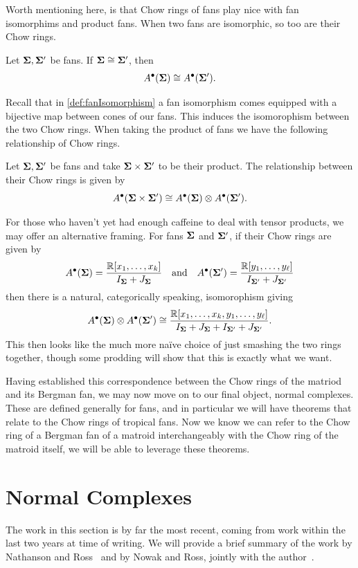 \documentclass[12pt,oneside]{../../sfsuthesis}
\begin{document}
Worth mentioning here, is that Chow rings of fans play nice with fan isomorphims and product fans.
When two fans are isomorphic, so too are their Chow rings.
\begin{proposition}
    Let \( {\bm{\Sigma}}, {\bm{\Sigma}}' \) be fans. If  \( {\bm{\Sigma}} \cong {\bm{\Sigma}}' \), then
    \[
        A^\bullet({\bm{\Sigma}}) \cong A^\bullet({\bm{\Sigma}}').
    \]
\end{proposition}
Recall that in \th\ref{def:fanIsomorphism} a fan isomorphism comes equipped with a bijective map between cones of our fans.
This induces the isomorophism between the two Chow rings.
When taking the product of fans we have the following relationship of Chow rings.
\begin{proposition}
    Let \( {\bm{\Sigma}}, {\bm{\Sigma}}' \) be fans and take \( {\bm{\Sigma}} \times {\bm{\Sigma}}' \) to be their product.
    The relationship between their Chow rings is given by
    \[
        A^\bullet({\bm{\Sigma}} \times {\bm{\Sigma}}') \cong A^\bullet({\bm{\Sigma}}) \otimes A^\bullet({\bm{\Sigma}}').
    \]
\end{proposition}
For those who haven't yet had enough caffeine to deal with tensor products, we may offer an alternative framing.
For fans \( {\bm{\Sigma}} \) and \( {\bm{\Sigma}}' \), if their Chow rings are given by
\[
    A^\bullet({\bm{\Sigma}}) = \frac{\mathbb{R}[x_1, \dots, x_k]}{I_{{\bm{\Sigma}}} + J_{{\bm{\Sigma}}}}
    \quad \text{and} \quad
    A^\bullet({\bm{\Sigma}}') = \frac{\mathbb{R}[y_1, \dots, y_\ell]}{I_{{\bm{\Sigma}}'} + J_{{\bm{\Sigma}}'}}
\]
then there is a natural, categorically speaking, isomorophism giving
\[
    A^\bullet({\bm{\Sigma}}) \otimes A^\bullet({\bm{\Sigma}}') \cong
    \frac{\mathbb{R}[x_1, \dots, x_k, y_1, \dots, y_\ell]}{I_{{\bm{\Sigma}}} + J_{{\bm{\Sigma}}} + I_{{\bm{\Sigma}}'} + J_{{\bm{\Sigma}}'}}.
\]
This then looks like the much more na\"ive choice of just smashing the two rings together, though some prodding will show that this is exactly what we want.

Having established this correspondence between the Chow rings of the matriod and its Bergman fan, we may now move on to our final object, normal complexes.
These are defined generally for fans, and in particular we will have theorems that relate to the Chow rings of tropical fans.
Now we know we can refer to the Chow ring of a Bergman fan of a matroid interchangeably with the Chow ring of the matroid itself, we will be able to leverage these theorems.


\section{Normal Complexes}
The work in this section is by far the most recent, coming from work within the last two years at time of writing.
We will provide a brief summary of the work by Nathanson and Ross~\cite{nathansonTropicalFansNormal2023} and by Nowak and Ross, jointly with the author~\cite{nowakMixedVolumesNormal2023}.
\end{document}

